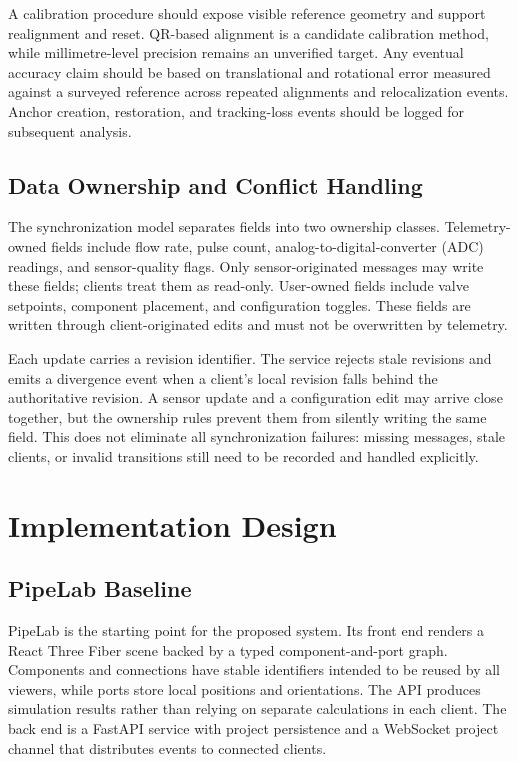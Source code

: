 \documentclass[conference]{IEEEtran}
\begin{document}
A calibration procedure should expose visible reference geometry and support realignment and reset. QR-based alignment is a candidate calibration method, while millimetre-level precision remains an unverified target. Any eventual accuracy claim should be based on translational and rotational error measured against a surveyed reference across repeated alignments and relocalization events. Anchor creation, restoration, and tracking-loss events should be logged for subsequent analysis.

\subsection{Data Ownership and Conflict Handling}
The synchronization model separates fields into two ownership classes. Telemetry-owned fields include flow rate, pulse count, analog-to-digital-converter (ADC) readings, and sensor-quality flags. Only sensor-originated messages may write these fields; clients treat them as read-only. User-owned fields include valve setpoints, component placement, and configuration toggles. These fields are written through client-originated edits and must not be overwritten by telemetry.

Each update carries a revision identifier. The service rejects stale revisions and emits a divergence event when a client's local revision falls behind the authoritative revision. A sensor update and a configuration edit may arrive close together, but the ownership rules prevent them from silently writing the same field. This does not eliminate all synchronization failures: missing messages, stale clients, or invalid transitions still need to be recorded and handled explicitly.

\section{Implementation Design}
\subsection{PipeLab Baseline}
PipeLab is the starting point for the proposed system. Its front end renders a React Three Fiber scene backed by a typed component-and-port graph. Components and connections have stable identifiers intended to be reused by all viewers, while ports store local positions and orientations. The API produces simulation results rather than relying on separate calculations in each client. The back end is a FastAPI service with project persistence and a WebSocket project channel that distributes events to connected clients.
\end{document}
